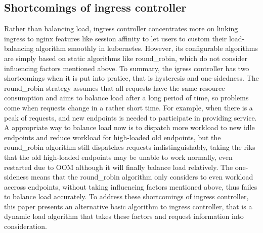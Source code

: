 \subsection{Shortcomings of ingress controller}
\label{subsec:Shortcoming}
Rather than balancing load, ingress controller concentrates more on linking ingress to nginx features like session affinity to let users to custom their load-balancing algorithm smoothly in kubernetes. However, its configurable algorithms are simply based on static algorithms like round\_robin, which do not consider influencing factors mentioned above. To summary, the igress controller has two shortcomings when it is put into pratice, that is hysteresis and one-sidedness. The round\_robin strategy assumes that all requests have the same resource consumption and aims to balance load after a long period of time, so problems come when requests change in a rather short time. For example, when there is a peak of requests, and new endpoints is needed to participate in providing service. A appropriate way to balance load now is to dispatch more workload to new idle endpoints and reduce workload for high-loaded old endpoints, but the round\_robin algorithm still dispatches requests indistinguishably, taking the riks that the old high-loaded endpoints may be unable to work normally, even restarted due to OOM although it will finally balance load relatively. The one-sideness means that the round\_robin algorithm only considers to even workload accross endpoints, without taking influencing factors mentioned above, thus failes to balance load accurately. To address these shortcomings of ingress controller, this paper presents an alternative basic algorithm to ingress controller, that is a dynamic load algorithm that takes these factors and request information into consideration.

